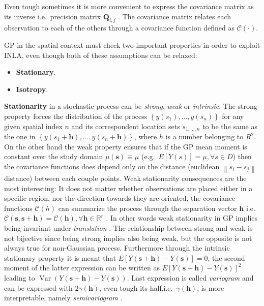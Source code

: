 \documentclass[
  12pt,
  a4paper,
  oneside]{book}
\providecommand{\tightlist}{%
  \setlength{\itemsep}{0pt}\setlength{\parskip}{0pt}}
\theoremstyle{definition}
\theoremstyle{definition}
\theoremstyle{definition}
\theoremstyle{remark}
\begin{document}
Even tough sometimes it is more convenient to express the covariance matrix as its inverse i.e.~precision matrix \(\boldsymbol{Q}_{i,j}\) \citep{Blangiardo-Cameletti}. The covariance matrix relates each observation to each of the others through a covariance function defined as \(\mathcal{C}(\cdot)\).

GP in the spatial context must check two important properties in order to exploit INLA, even though both of these assumptions can be relaxed:

\begin{itemize}
\tightlist
\item
  \textbf{Stationary}.
\item
  \textbf{Isotropy}.
\end{itemize}

\textbf{Stationarity} in a stochastic process can be \emph{strong}, \emph{weak} or \emph{intrinsic}. The strong property forces the distribution of the process \(\left\{y\left(s_{1}\right), \ldots, y\left(s_{n}\right)\right\}\) for any given spatial index \(n\) and its correspondent location sets \(s_{1,\ldots,n}\) to be the same as the one in \(\left\{y\left(s_{1}+\boldsymbol{h}\right), \ldots, y\left(s_{n}+\boldsymbol{h}\right)\right\}\), where \(h\) is a number belonging to \(R^{2}\).
On the other hand the weak property ensures that if the GP mean moment is constant over the study domain \(\mu(\mathbf{s}) \equiv \mu\) (e.g.~\(E[Y(s)]=\mu, \forall s \in D\)) then the covariance functions does depend only on the distance (euclidean \(\left\|s_{i}-s_{j}\right\|\) distance) between each couple points.
Weak stationarity consequences are the most interesting: It does not matter whether observations are placed either in a specific region, nor the direction towards they are oriented, the covariance functions \(\mathcal{C}(h)\) can summarize the process through the separation vector \(\mathbf{h}\) i.e.~\(\mathcal{C}(\mathbf{s}, \mathbf{s}+\mathbf{h})=\mathcal{C}(\mathbf{h}), \forall \mathbf{h} \in \mathbb{R}^{r}\) \citep{Banerjee-Gelfand}. In other words weak stationarity in GP implies being invariant under \emph{translation} \citeyearpar{Krainski-Rubio}. The relationship between strong and weak is not bijective since being strong implies also being weak, but the opposite is not always true for non-Gaussian process.
Furthermore through the intrinsic stationary property it is meant that \(E[Y(\mathbf{s}+\mathbf{h})-Y(\mathbf{s})]=0\), the second moment of the latter expression can be written as \(E[Y(\mathbf{s}+\mathbf{h})-Y(\mathbf{s})]^{2}\) leading to \(\operatorname{Var}(Y(\mathbf{s}+\mathbf{h})-Y(\mathbf{s}))\). Last expression is called \emph{variogram} and can be expressed with \(2 \gamma(\mathbf{h})\), even tough its half,i.e.~\(\gamma(\mathbf{h})\), is more interpretable, namely \emph{semivariogram} \citep{Cressie_2015}.
\end{document}
